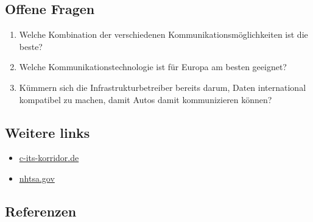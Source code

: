 \documentclass[
]{book}
\providecommand{\tightlist}{%
  \setlength{\itemsep}{0pt}\setlength{\parskip}{0pt}}
\begin{document}
\hypertarget{offene-fragen-18}{%
\subsection*{Offene Fragen}\label{offene-fragen-18}}

\begin{enumerate}
\def\labelenumi{\arabic{enumi}.}
\tightlist
\item
  Welche Kombination der verschiedenen Kommunikationsmöglichkeiten ist die beste?
\item
  Welche Kommunikationstechnologie ist für Europa am besten geeignet?
\item
  Kümmern sich die Infrastrukturbetreiber bereits darum, Daten international kompatibel zu machen, damit Autos damit kommunizieren können?
\end{enumerate}

\hypertarget{weitere-links-15}{%
\subsection*{Weitere links}\label{weitere-links-15}}

\begin{itemize}
\tightlist
\item
  \href{https://c-its-korridor.de/?menuId=1\&sp=en}{c-its-korridor.de}
\item
  \href{https://www.nhtsa.gov/technology-innovation/vehicle-vehicle-communication}{nhtsa.gov}
\end{itemize}

\hypertarget{referenzen-18}{%
\subsection*{Referenzen}\label{referenzen-18}}
\end{document}

